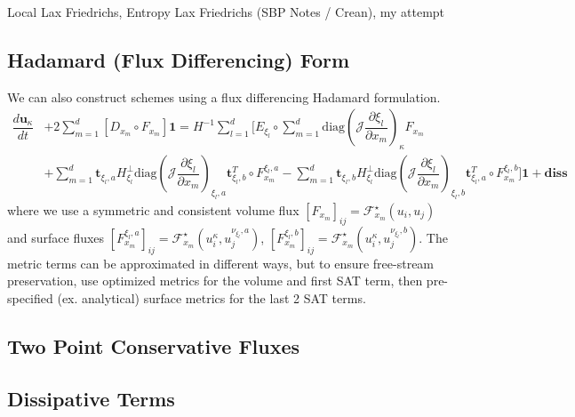 \documentclass[12pt,a4paper]{article}
\newcommand{\pder}[2][]{\dfrac{\partial #1}{\partial #2}} %
\newcommand{\der}[2][]{\dfrac{d #1}{d #2}} %
\newcommand{\fn}[1]{\mathcal{#1}} %
\begin{document}
Local Lax Friedrichs, Entropy Lax Friedrichs (SBP Notes / Crean), my attempt

\subsection{Hadamard (Flux Differencing) Form}

We can also construct schemes using a flux differencing Hadamard formulation.
\begin{align*}
\der[\bm{u}_\kappa]{t} &+ 2 \sum_{m=1}^d \left[ D_{x_m} \circ F_{x_m} \right] \bm{1}  
= H^{-1} \sum_{l=1}^d \Bigg[ E_{\xi_l} \circ \sum_{m=1}^d \text{diag} \left( \fn{J} \pder[\xi_l]{x_m} \right)_{\kappa} F_{x_m} \\
&  + \sum_{m=1}^d \bm{t}_{\xi_l, a} H^{\bot}_{\xi_l} \text{diag} \left( \fn{J} \pder[\xi_l]{x_m} \right)_{\xi_l,a} \bm{t}_{\xi_l, b}^T \circ  F_{x_m}^{\xi_l , a} 
 - \sum_{m=1}^d \bm{t}_{\xi_l, b} H^{\bot}_{\xi_l}  \text{diag} \left( \fn{J} \pder[\xi_l]{x_m} \right)_{\xi_l,b} \bm{t}_{\xi_l, a}^T \circ F_{x_m}^{\xi_l , b}
\Bigg] \bm{1} + \textbf{diss}
\end{align*}
where we use a symmetric and consistent volume flux $ [F_{x_m}]_{ij} = \fn{F}^\star_{x_m} (u_i, u_j)$ and surface fluxes $ [F_{x_m}^{\xi_l , a} ]_{ij} = \fn{F}^\star_{x_m} (u^\kappa_i, u^{\nu_{\xi_l} , a}_j)$, $ [F_{x_m}^{\xi_l , b}]_{ij} = \fn{F}^\star_{x_m} (u^\kappa_i, u^{\nu_{\xi_l} , b}_j)$. The metric terms can be approximated in different ways, but to ensure free-stream preservation, use optimized metrics for the volume and first SAT term, then pre-specified (ex. analytical) surface metrics for the last 2 SAT terms. 


\subsection{Two Point Conservative Fluxes}

\subsection{Dissipative Terms}
\end{document}
